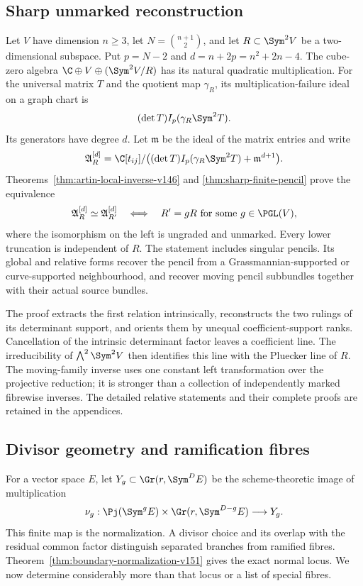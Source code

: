\subsection{Sharp unmarked reconstruction}
Let $V$ have dimension $n\geq3$, let $N=\binom{n+1}{2}$, and let
$R\subset\Sym^2V$ be a two-dimensional subspace. Put $p=N-2$ and
$d=n+2p=n^2+2n-4$. The cube-zero algebra
$\C\oplus V\oplus(\Sym^2V/R)$ has its natural quadratic multiplication.
For the universal matrix $T$ and the quotient map $\gamma_R$, its
multiplication-failure ideal on a graph chart is
\[
       (\det T) I_p(\gamma_R\Sym^2T).
\]
Its generators have degree $d$. Let $\mathfrak m$ be the ideal of the
matrix entries and write
\[
 \mathfrak A_R^{[d]}=
 \C[t_{ij}]/\bigl((\det T)I_p(\gamma_R\Sym^2T)+\mathfrak m^{d+1}\bigr).
\]
Theorems~\ref{thm:artin-local-inverse-v146} and
\ref{thm:sharp-finite-pencil} prove the equivalence
\[
 \mathfrak A_R^{[d]}\simeq\mathfrak A_{R'}^{[d]}
 \quad\Longleftrightarrow\quad
 R'=gR\text{ for some }g\in\PGL(V),
\]
where the isomorphism on the left is ungraded and unmarked. Every lower
truncation is independent of $R$. The statement includes singular
pencils. Its global and relative forms recover the pencil from a
Grassmannian-supported or curve-supported neighbourhood, and recover
moving pencil subbundles together with their actual source bundles.

The proof extracts the first relation intrinsically, reconstructs the
two rulings of its determinant support, and orients them by unequal
coefficient-support ranks. Cancellation of the intrinsic determinant
factor leaves a coefficient line. The irreducibility of
$\bigwedge^2\Sym^2V$ then identifies this line with the Pluecker line
of $R$. The moving-family inverse uses one constant left transformation
over the projective reduction; it is stronger than a collection of
independently marked fibrewise inverses. The detailed relative statements
and their complete proofs are retained in the appendices.

\subsection{Divisor geometry and ramification fibres}
For a vector space $E$, let $Y_g\subset\Gr(r,\Sym^D E)$ be the
scheme-theoretic image of multiplication
\[
 \nu_g:\Pj(\Sym^g E)\times\Gr(r,\Sym^{D-g}E)\longrightarrow Y_g.
\]
This finite map is the normalization. A divisor choice and its overlap
with the residual common factor distinguish separated branches from
ramified fibres. Theorem~\ref{thm:boundary-normalization-v151} gives
the exact normal locus. We now determine considerably more than that
locus or a list of special fibres.

